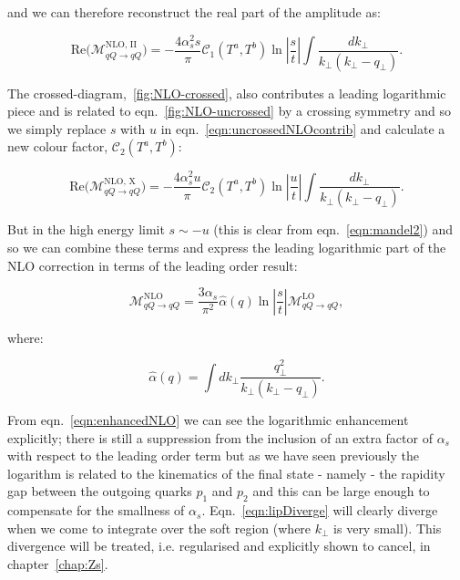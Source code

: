 	and we can therefore reconstruct the real part of the amplitude as:

	\begin{equation}
		\text{Re}\Big(\mathcal{M}_{qQ\rightarrow qQ}^{\text{NLO, II}}\Big) =
		-\frac{4\alpha_s^2s}{\pi} \mathcal{C}_1(T^a,T^b)
		\ln\left|\frac{s}{t}\right|\int \frac{dk_{\perp}}{k_{\perp}(k_{\perp} - q_{\perp})}.
		\label{eqn:uncrossedNLOcontrib}
	\end{equation}

	The crossed-diagram,~\eqref{fig:NLO-crossed}, also contributes a leading logarithmic piece and is related to
	eqn.~\eqref{fig:NLO-uncrossed} by a crossing symmetry and so we simply replace $s$ with $u$ in
	eqn.~\eqref{eqn:uncrossedNLOcontrib} and calculate a new colour factor, $\mathcal{C}_2(T^a,T^b)$:

	\begin{equation}
		\text{Re}\Big(\mathcal{M}_{qQ\rightarrow qQ}^{\text{NLO, X}}\Big) =
		-\frac{4\alpha_s^2u}{\pi} \mathcal{C}_2(T^a,T^b)
		\ln\left|\frac{u}{t}\right| \int \frac{dk_{\perp}}{k_{\perp}(k_{\perp} - q_{\perp})}.
		\label{eqn:crossedNLOcontrib}
	\end{equation}

	But in the high energy limit $s\sim -u$ (this is clear from eqn.~\eqref{eqn:mandel2}) and so we
	can combine these terms and express the leading logarithmic part of the NLO correction in terms of the leading order
	result:

	\begin{equation}
		\mathcal{M}_{qQ\rightarrow qQ}^{\text{NLO}} = \frac{3\alpha_s}{\pi^2}
		\hat{\alpha}(q)\ln\left|\frac{s}{t}\right|
		\mathcal{M}_{qQ\rightarrow qQ}^{\text{LO}},
		\label{eqn:enhancedNLO}
	\end{equation}

	where:

	\begin{equation}
		\hat{\alpha}(q) = \int dk_{\perp}\frac{q_{\perp}^2}{k_{\perp}(k_{\perp} - q_{\perp})}.
		\label{eqn:lipDiverge}
	\end{equation}

	From eqn.~\eqref{eqn:enhancedNLO} we can see the logarithmic enhancement explicitly; there is still
	a suppression from the inclusion of an extra factor of $\alpha_s$ with respect to the leading
	order term but as we have seen previously the logarithm is related to the kinematics of the final
	state - namely - the rapidity gap between the outgoing quarks $p_1$ and $p_2$ and this can be large enough to compensate
	for the smallness of $\alpha_s$.  Eqn.~\eqref{eqn:lipDiverge} will clearly diverge when we
	come to integrate over the soft region (where $k_\perp$ is very small).  This divergence
	will be treated, i.e. regularised and explicitly shown to cancel, in chapter~\ref{chap:Zs}.

